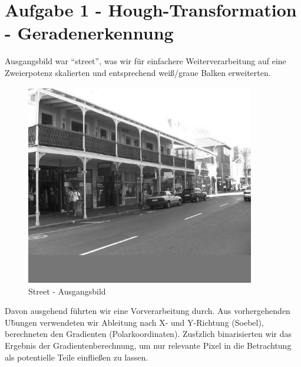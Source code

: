



\newcommand{\nr}{10}
\lstset{language=matlab}


\section*{Aufgabe 1 - Hough-Transformation - Geradenerkennung}

Ausgangsbild war ``street'', was wir f\"ur einfachere Weiterverarbeitung
auf eine Zweierpotenz skalierten und entsprechend wei\ss{}/graue Balken
erweiterten.
\begin{figure}[H]
\begin{center}
\includegraphics[width=100mm]{u10/street.eps}
\end{center}
\label{street}
\caption{Street - Ausgangsbild}
\end{figure}

Davon ausgehend f\"uhrten wir eine Vorverarbeitung durch. Aus vorhergehenden
U\"bungen verwendeten wir Ableitung nach X- und Y-Richtung (Soebel), berechneten 
den Gradienten (Polarkoordinaten). Zus\"tzlich binarisierten wir das Ergebnis der Gradientenberechnung,
um nur relevante Pixel in die Betrachtung als potentielle Teile einflie\ss{}en zu lassen.

